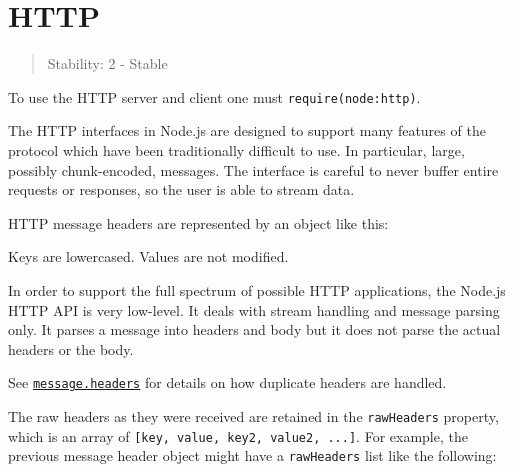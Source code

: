 \section{HTTP}\label{http}

\begin{quote}
Stability: 2 - Stable
\end{quote}

To use the HTTP server and client one must
\texttt{require(\textquotesingle{}node:http\textquotesingle{})}.

The HTTP interfaces in Node.js are designed to support many features of
the protocol which have been traditionally difficult to use. In
particular, large, possibly chunk-encoded, messages. The interface is
careful to never buffer entire requests or responses, so the user is
able to stream data.

HTTP message headers are represented by an object like this:

\begin{Shaded}
\begin{Highlighting}[]
\FunctionTok{\{} \FunctionTok{:} \FunctionTok{,}
  \FunctionTok{:} \FunctionTok{,}
  \FunctionTok{:} \FunctionTok{,}
  \FunctionTok{:} \FunctionTok{,}
  \FunctionTok{:}  \FunctionTok{\}}
\end{Highlighting}
\end{Shaded}

Keys are lowercased. Values are not modified.

In order to support the full spectrum of possible HTTP applications, the
Node.js HTTP API is very low-level. It deals with stream handling and
message parsing only. It parses a message into headers and body but it
does not parse the actual headers or the body.

See \hyperref[messageheaders]{\texttt{message.headers}} for details on
how duplicate headers are handled.

The raw headers as they were received are retained in the
\texttt{rawHeaders} property, which is an array of
\texttt{{[}key,\ value,\ key2,\ value2,\ ...{]}}. For example, the
previous message header object might have a \texttt{rawHeaders} list
like the following:

